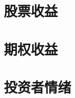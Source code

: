 \documentclass[11pt]{article}
\begin{document}
\maketitle
\tableofcontents

\section{股票收益}

\section{期权收益}

\section{投资者情绪}
\end{document}
